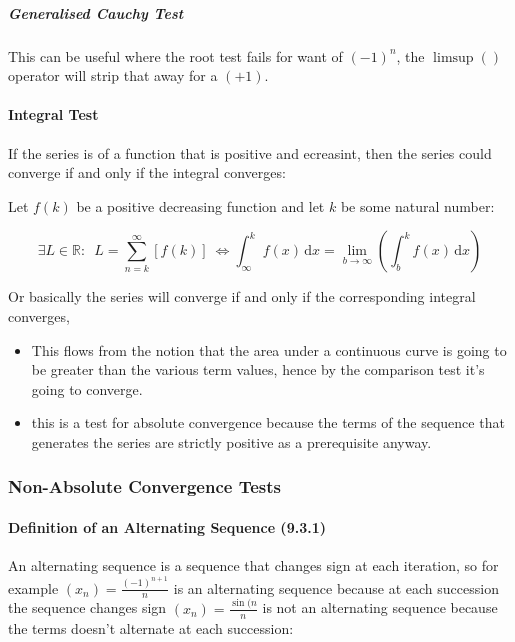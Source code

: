\documentclass[class=article, crop=false]{standalone}
\begin{document}
\hypertarget{header-n3274}{%
\subparagraph{\texorpdfstring{Generalised \emph{Cauchy}
Test}{Generalised Cauchy Test}}\label{header-n3274}}

This can be useful where the root test fails for want of \((-1)^n\), the
\(\limsup()\) operator will strip that away for a \((+1)\).

\hypertarget{header-n3276}{%
\paragraph{Integral Test}\label{header-n3276}}

If the series is of a function that is positive and ecreasint, then the
series could converge if and only if the integral converges:

Let \(f(k)\) be a positive decreasing function and let \(k\) be some
natural number:

\[\exists L\in \mathbb{R} : \enspace L = \sum^\infty_{n=k} \left[ f(k) \right] \ \iff \int_\infty^k \! f(x) \, \mathrm{d}x = \lim_{b\rightarrow\infty}\left( \int_b^k \! f(x) \, \mathrm{d}x\right)\]

Or basically the series will converge if and only if the corresponding
integral converges,

\begin{itemize}
\item
  This flows from the notion that the area under a continuous curve is
  going to be greater than the various term values, hence by the
  comparison test it's going to converge.
\item
  this is a test for absolute convergence because the terms of the
  sequence that generates the series are strictly positive as a
  prerequisite anyway.
\end{itemize}

\newpage 

\hypertarget{header-n3286}{%
\subsubsection{Non-Absolute Convergence Tests}\label{header-n3286}}

\hypertarget{header-n3287}{%
\paragraph{Definition of an Alternating Sequence
(9.3.1)}\label{header-n3287}}

An alternating sequence is a sequence that changes sign at each
iteration, so for example \((x_n) = \frac{(-1)^{n+1}}{n}\) is an
alternating sequence because at each succession the sequence changes
sign \((x_n) = \frac{\sin(n}{n}\) is not an alternating sequence because
the terms doesn't alternate at each succession:
\end{document}
